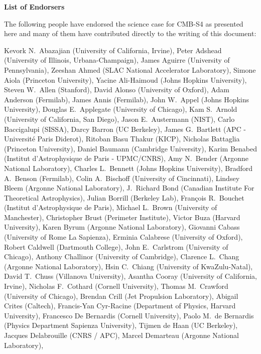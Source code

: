 \begin{center}
\textbf{List of Endorsers}
\end{center}

The following people have endorsed the science case for CMB-S4 as presented here and many of them have contributed directly to the writing of this document:

Kevork N.~Abazajian (University of California, Irvine),
Peter Adshead (University of Illinois, Urbana-Champaign),
James Aguirre (University of Pennsylvania),
Zeeshan Ahmed (SLAC National Accelerator Laboratory),
Simone Aiola (Princeton University),
Yacine Ali-Haimoud (Johns Hopkins University),
Steven W.~Allen (Stanford),
David Alonso (University of Oxford),
Adam Anderson (Fermilab),
James Annis (Fermilab),
John W.~Appel (Johns Hopkins University),
Douglas E.~Applegate (University of Chicago),
Kam S.~Arnold (University of California, San Diego),
Jason E.~Austermann (NIST),
Carlo Baccigalupi (SISSA),
Darcy Barron (UC Berkeley),
James G.~Bartlett (APC - Université Paris Diderot),
Ritoban Basu Thakur (KICP),
Nicholas Battaglia (Princeton University),
Daniel Baumann (Cambridge University),
Karim Benabed (Institut d'Astrophysique de Paris - UPMC/CNRS),
Amy N.~Bender (Argonne National Laboratory),
Charles L.~Bennett (Johns Hopkins University),
Bradford A.~Benson (Fermilab),
Colin A.~Bischoff (University of Cincinnati),
Lindsey Bleem (Argonne National Laboratory),
J.~Richard Bond (Canadian Institute For Theoretical Astrophysics),
Julian Borrill (Berkeley Lab),
François R.~Bouchet (Institut d'Astrophysique de Paris),
Michael L.~Brown (University of Manchester),
Christopher Brust (Perimeter Institute),
Victor Buza (Harvard University),
Karen Byrum (Argonne National Laboratory),
Giovanni Cabass (University of Rome La Sapienza),
Erminia Calabrese (University of Oxford),
Robert Caldwell (Dartmouth College),
John E.~Carlstrom (University of Chicago),
Anthony Challinor (University of Cambridge),
Clarence L.~Chang (Argonne National Laboratory),
Hsin C.~Chiang (University of KwaZulu-Natal),
David T.~Chuss (Villanova University),
Asantha Cooray (University of California, Irvine),
Nicholas F.~Cothard (Cornell University),
Thomas M.~Crawford (University of Chicago),
Brendan Crill (Jet Propulsion Laboratory),
Abigail Crites (Caltech),
Francis-Yan Cyr-Racine (Department of Physics, Harvard University),
Francesco De Bernardis (Cornell University),
Paolo M.~de Bernardis (Physics Department Sapienza University),
Tijmen de Haan (UC Berkeley),
Jacques Delabrouille (CNRS / APC),
Marcel Demarteau (Argonne National Laboratory),
